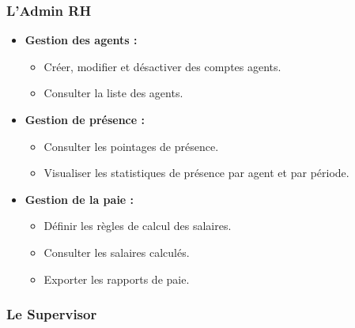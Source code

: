 \subsubsection{L'Admin RH}

\begin{itemize}[label=--, itemsep=3pt]
    \item \textbf{Gestion des agents :}
    \begin{itemize}[label=--, itemsep=2pt]
        \item Créer, modifier et désactiver des comptes agents.
        \item Consulter la liste des agents.
    \end{itemize}

    \item \textbf{Gestion de présence :}
    \begin{itemize}[label=--, itemsep=2pt]
        \item Consulter les pointages de présence.
        \item Visualiser les statistiques de présence par agent et par période.
    \end{itemize}

    \item \textbf{Gestion de la paie :}
    \begin{itemize}[label=--, itemsep=2pt]
        \item Définir les règles de calcul des salaires.
        \item Consulter les salaires calculés.
        \item Exporter les rapports de paie.
    \end{itemize}
\end{itemize}

\subsubsection{Le Supervisor}

